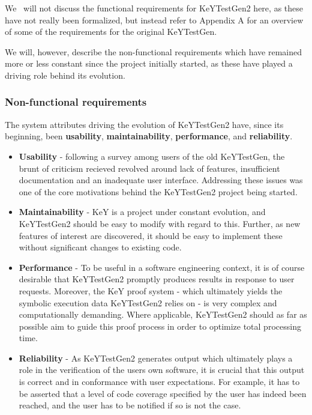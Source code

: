 \documentclass{article}
\newcommand{\tmstrong}[1]{\textbf{#1}}
\newenvironment{itemizedot}{\begin{itemize} \renewcommand{\labelitemi}{$\bullet$}\renewcommand{\labelitemii}{$\bullet$}\renewcommand{\labelitemiii}{$\bullet$}\renewcommand{\labelitemiv}{$\bullet$}}{\end{itemize}}
\begin{document}
We \ will not discuss the functional requirements for KeYTestGen2 here, as
these have not really been formalized, but instead refer to Appendix A for an
overview of some of the requirements for the original KeYTestGen.

We will, however, describe the non-functional requirements which have
remained more or less constant since the project initially started, as these
have played a driving role behind its evolution.



\subsubsection{Non-functional requirements}

The system attributes driving the evolution of KeYTestGen2 have, since its
beginning, been {\tmstrong{usability}}, {\tmstrong{maintainability}},
{\tmstrong{performance}}, and {\tmstrong{reliability}}.
\begin{itemizedot}
  \item {\tmstrong{Usability}} - following a survey among users of the old
  KeYTestGen, the brunt of criticism recieved revolved around lack of
  features, insufficient documentation and an inadequate user interface.
  Addressing these issues was one of the core motivations behind the
  KeYTestGen2 project being started.
  
  \item {\tmstrong{Maintainability}} - KeY is a project under constant
  evolution, and KeYTestGen2 should be easy to modify with regard to this.
  Further, as new features of interest are discovered, it should be easy to
  implement these without significant changes to existing code.
  
  \item {\tmstrong{Performance}} - To be useful in a software engineering
  context, it is of course desirable that KeYTestGen2 promptly produces
  results in response to user requests. Moreover, the KeY proof system - which
  ultimately yields the symbolic execution data KeYTestGen2 relies on - is
  very complex and computationally demanding. Where applicable, KeYTestGen2
  should as far as possible aim to guide this proof process in order to
  optimize total processing time.
  
  \item {\tmstrong{Reliability}} - As KeYTestGen2 generates output which
  ultimately plays a role in the verification of the users own software, it is
  crucial that this output is correct and in conformance with user
  expectations. For example, it has to be asserted that a level of code
  coverage specified by the user has indeed been reached, and the user has to
  be notified if so is not the case. \ \ \ 
\end{itemizedot}
\end{document}
